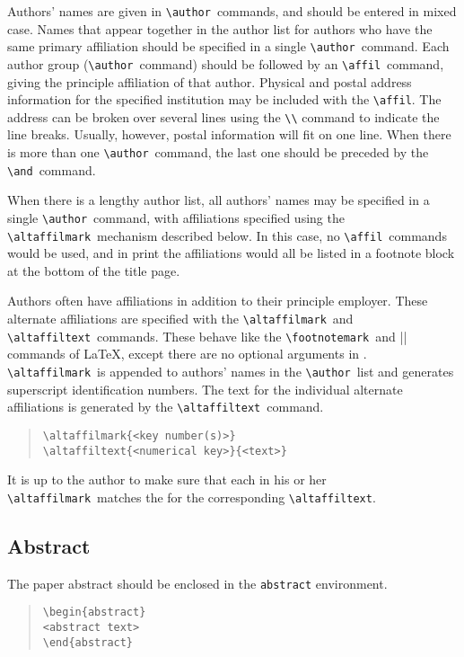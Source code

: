 \documentclass[preprint2]{aastex}
\begin{document}
Authors' names are given in \verb"\author"\ 
 commands, 
and should be entered in mixed case. 
Names that appear together in the author list for authors who 
have the same primary affiliation should be specified in a single 
\verb"\author"\  command. 
Each author group (\verb"\author"\  command) 
should be followed by an \verb"\affil"\  command, giving the principle 
affiliation of that author.  Physical and postal address information 
for the specified institution  may be included with the \verb"\affil". 
The address can be broken over several lines using the 
\verb"\\" command to indicate 
the line breaks. 
Usually, however, postal information will fit on one line. 
When there is more than one \verb"\author"\  command, the last 
one should be preceded by the \verb"\and"\  command. 
 
When there is a lengthy author list, all authors' names may be 
specified in a single \verb"\author"\ 
 command, with affiliations 
specified using the \verb"\altaffilmark"\   me\-chan\-ism described below. 
In this case, no \verb"\affil"\ 
 commands would be used, and in print the 
affiliations would all be listed in a footnote block at the bottom 
of the title page. 
 
Authors often have affiliations in addition to their principle employer. 
These alternate affiliations are specified with the \verb"\altaffilmark"\ 
 and \verb"\altaffiltext"\ 
 commands. 
These behave like the \verb"\footnotemark"\ 
and |\footnotetext|  commands of \LaTeX, except there are no 
optional arguments in \aastex. 
\verb"\altaffilmark"\ 
 is appended to authors' names in the \verb"\author"\ 
 list and generates superscript identification numbers. 
The text for the individual alternate affiliations is generated by the 
\verb"\altaffiltext"\ 
 command. 
\begin{quote} 
\begin{verbatim} 
\altaffilmark{<key number(s)>} 
\altaffiltext{<numerical key>}{<text>} 
\end{verbatim} 
\end{quote} 
It is up to the author to make sure that 
 each \m{key number}  in his or her \verb"\altaffilmark"\ 
 matches the  for 
the corresponding \verb"\altaffiltext". 
 
\subsection{Abstract} 
 
The paper abstract should be enclosed in the 
\texttt{abstract} environment. 
\begin{quote} 
\begin{verbatim} 
\begin{abstract} 
<abstract text> 
\end{abstract} 
\end{verbatim} 
\end{quote} 
 
\end{document}
